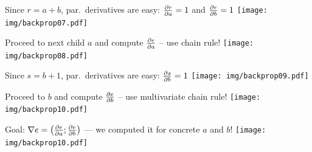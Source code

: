 \documentclass[12pt,aspectratio=169,handout]{beamer}
\begin{document}
\begin{frame}{Since $r = a + b$, par.\ derivatives are easy: $\pdv{r}{a} = 1$ and $\pdv{r}{b} = 1$}
	\texttt{[image: img/backprop07.pdf]}
\end{frame}

\begin{frame}{Proceed to next child $a$ and compute $\pdv{e}{a}$ -- use chain rule!}
	\texttt{[image: img/backprop08.pdf]}
\end{frame}

\begin{frame}{Since $s = b + 1$, par.\ derivatives are easy: $\pdv{s}{b} = 1$}
	\texttt{[image: img/backprop09.pdf]}
\end{frame}

\begin{frame}{Proceed to $b$ and compute $\pdv{e}{b}$ -- use multivariate chain rule!}
	\texttt{[image: img/backprop10.pdf]}
\end{frame}


\begin{frame}{Goal: $\nabla e = \left( \pdv{e}{a}; \pdv{e}{b} \right)$ --- we computed it for concrete $a$ and $b$!}
	\texttt{[image: img/backprop10.pdf]}
\end{frame}
\end{document}
